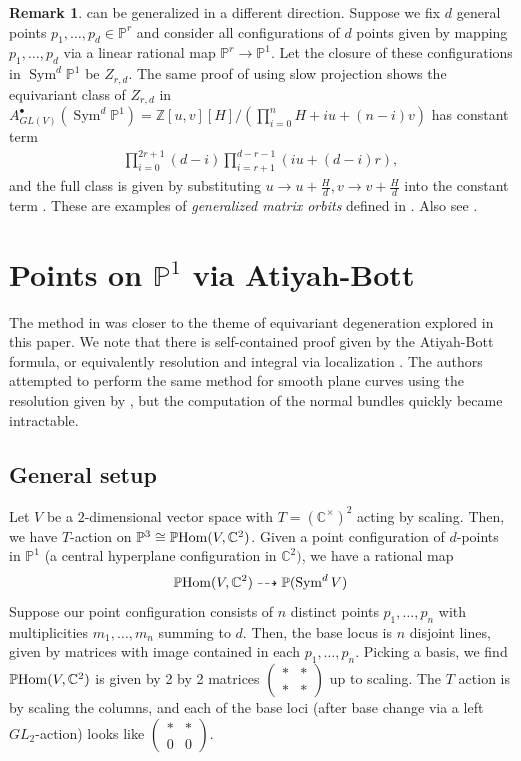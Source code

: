 \documentclass[12 pt, reqno]{amsart}
\theoremstyle{definition}
\newtheorem{rmk}[thm]{Remark}
\newcommand{\on}{\operatorname}
\newcommand{\mb}{\mathbb}
\begin{document}
\begin{rmk}
   can be generalized in a different
  direction. Suppose we fix $d$ general points
  $p_1,\ldots,p_d\in \mathbb{P}^r$ and consider all configurations of
  $d$ points given by mapping $p_1,\ldots,p_d$ via a linear rational
  map $\mathbb{P}^r\to \mathbb{P}^1$. Let the closure of these
  configurations in $\on{Sym}^d\mathbb{P}^1$ be $Z_{r,d}$. The same
  proof of  using slow projection shows the equivariant class
  of $Z_{r,d}$ in
  $A^{\bullet}_{GL(V)}(\on{Sym}^d\mathbb{P}^1)=\mathbb{Z}[u,v][H]/(\prod_{i=0}^{n}{H+iu+(n-i)v})$
  has constant term
\begin{align*}
    \prod_{i=0}^{2r+1}{(d-i)}\prod_{i=r+1}^{d-r-1}{(iu+(d-i)r)},
\end{align*}
and the full class is given by substituting
$u\to u+\frac{H}{d},v\to v+\frac{H}{d}$ into the constant term
\cite[Theorem 6.1]{FNR05}. These are examples of \emph{generalized
  matrix orbits} defined in \cite{FML}. Also see \cite[Example
1.3]{T19}.
\end{rmk}
\section{Points on $\mathbb{P}^1$ via Atiyah-Bott}
\label{AB}
The method in  was closer to the theme of
equivariant degeneration explored in this paper. We note that there is
self-contained proof given by the Atiyah-Bott formula, or equivalently
resolution and integral via localization \cite[Section 4]{FR06}. The
authors attempted to perform the same method for smooth plane curves
using the resolution given by \cite{AF93}, but the computation of the
normal bundles quickly became intractable.

\subsection{General setup}
Let $V$ be a $2$-dimensional vector space with $T=(\mb{C}^{\times})^2$
acting by scaling. Then, we have $T$-action on
$\mb{P}^3\cong \mb{P}{\rm Hom}(V,\mb{C}^2)$. Given a point
configuration of $d$-points in $\mb{P}^1$ (a central hyperplane
configuration in $\mb{C}^2)$, we have a rational map
\begin{align*}
\mb{P}{\rm Hom}(V,\mb{C}^2)\dashrightarrow \mathbb{P}(\on{Sym}^dV)
\end{align*}
Suppose our point configuration consists of $n$ distinct points $p_1,\ldots,p_n$ with multiplicities $m_1,\ldots,m_n$ summing to $d$. Then, the base locus is $n$ disjoint lines, given by matrices with image contained in each $p_1,\ldots,p_n$. Picking a basis, we find
$\mb{P}{\rm Hom}(V,\mb{C}^2)$ is given by 2 by 2 matrices
$\begin{pmatrix} \ast & \ast \\ \ast & \ast \end{pmatrix}$ up to
scaling. The $T$ action is by scaling the columns, and each of the
base loci (after base change via a left $GL_2$-action) looks like
$\begin{pmatrix} \ast & \ast \\ 0 & 0\end{pmatrix}$.
\end{document}
